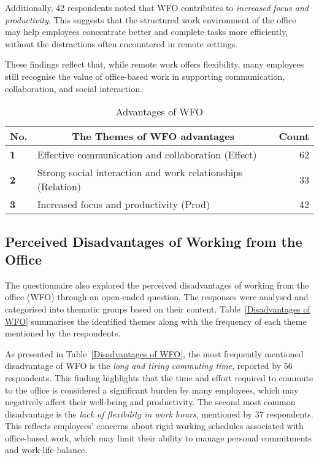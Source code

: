 \documentclass[a4paper, conference]{IEEEtran}
\begin{document}
Additionally, 42 respondents noted that WFO contributes to \textit{increased focus and productivity}. This suggests that the structured work environment of the office may help employees concentrate better and complete tasks more efficiently, without the distractions often encountered in remote settings.

These findings reflect that, while remote work offers flexibility, many employees still recognise the value of office-based work in supporting communication, collaboration, and social interaction.


\begin{table}[ht]
	\caption{Advantages of WFO}
	\label{Advanatage of WFO}
	\begin{tabular}{|p{}|p{}|r|}
		\hline
		\multicolumn{1}{|c|}{\textbf{No.}} & \multicolumn{1}{c|}{\textbf{The Themes of WFO advantages}} & \multicolumn{1}{c|}{\textbf{Count}} \\ \hline
		\textbf{1}             & Effective communication and collaboration (Effect)     & 62 %
		\\ \hline
		\textbf{2}             & Strong social interaction and work relationships (Relation)& 33 %
		\\ \hline
		\textbf{3}             & Increased focus and productivity (Prod)        & 42 %
		\\ \hline
	\end{tabular}
\end{table}

\subsection{Perceived Disadvantages of Working from the Office}
\label{sec:disadvantage-wfo}

The questionnaire also explored the perceived disadvantages of working from the office (WFO) through an open-ended question. The responses were analysed and categorised into thematic groups based on their content. Table~\ref{Disadvantages of WFO} summarises the identified themes along with the frequency of each theme mentioned by the respondents.

As presented in Table~\ref{Disadvantages of WFO}, the most frequently mentioned disadvantage of WFO is the \textit{long and tiring commuting time}, reported by 56 respondents. This finding highlights that the time and effort required to commute to the office is considered a significant burden by many employees, which may negatively affect their well-being and productivity. The second most common disadvantage is the \textit{lack of flexibility in work hours}, mentioned by 37 respondents. This reflects employees' concerns about rigid working schedules associated with office-based work, which may limit their ability to manage personal commitments and work-life balance.
\end{document}
